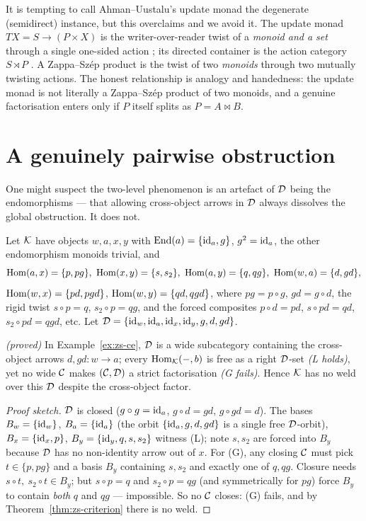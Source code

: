 \begin{remark}\label{rem:zs-au}
It is tempting to call Ahman--Uustalu's update monad \cite{au-update} the
degenerate (semidirect) instance, but this overclaims and we avoid it. The update
monad $TX=S\to(P\times X)$ is the writer-over-reader twist of a \emph{monoid and a
set} through a single one-sided action \cite{au-update}; its directed container is
the action category $S\rtimes P$ \cite{AU16}. A Zappa--Sz\'ep product is the
twist of two \emph{monoids} through two mutually twisting actions. The honest
relationship is analogy and handedness: the update monad is not literally a
Zappa--Sz\'ep product of two monoids, and a genuine factorisation enters only if
$P$ itself splits as $P=A\bowtie B$.
\end{remark}

\section{A genuinely pairwise obstruction}\label{sec:zs-ce}

One might suspect the two-level phenomenon is an artefact of $\mathcal{D}$ being the
endomorphisms --- that allowing cross-object arrows in $\mathcal{D}$ always dissolves the
global obstruction. It does not.

\begin{example}\label{ex:zs-ce}
Let $\mathcal{K}$ have objects $w,a,x,y$ with $\mathrm{End}(a)=\{\mathrm{id}_a,g\}$, $g^2=\mathrm{id}_a$, the other
endomorphism monoids trivial, and
\[
  \Hom(a,x)=\{p,pg\},\ \Hom(x,y)=\{s,s_2\},\ \Hom(a,y)=\{q,qg\},\
  \Hom(w,a)=\{d,gd\},
\]
$\mathrm{Hom}(w,x)=\{pd,pgd\}$, $\mathrm{Hom}(w,y)=\{qd,qgd\}$, where $pg=p\circ g$, $gd=g\circ d$,
the rigid twist $s\circ p=q$, $s_2\circ p=qg$, and the forced composites $p\circ
d=pd$, $s\circ pd=qd$, $s_2\circ pd=qgd$, etc. Let $\mathcal{D}=\{\mathrm{id}_w,\mathrm{id}_a,\mathrm{id}_x,\mathrm{id}_y,
g,d,gd\}$.
\end{example}

\begin{proposition}\label{prop:zs-ce}
\emph{(proved)}\;
In Example~\ref{ex:zs-ce}, $\mathcal{D}$ is a wide subcategory containing the cross-object
arrows $d,gd\colon w\to a$; every $\mathrm{Hom}_{\mathcal{K}}(-,b)$ is free as a right $\mathcal{D}$-set
\emph{(L holds)}, yet no wide $\mathcal{C}$ makes $(\mathcal{C},\mathcal{D})$ a strict factorisation
\emph{(G fails)}. Hence $\mathcal{K}$ has no weld over this $\mathcal{D}$ despite the cross-object
factor.
\end{proposition}

\begin{proof}[Proof sketch]
$\mathcal{D}$ is closed ($g\circ g=\mathrm{id}_a$, $g\circ d=gd$, $g\circ gd=d$). The bases
$B_w=\{\mathrm{id}_w\}$, $B_a=\{\mathrm{id}_a\}$ (the orbit $\{\mathrm{id}_a,g,d,gd\}$ is a single free
$\mathcal{D}$-orbit), $B_x=\{\mathrm{id}_x,p\}$, $B_y=\{\mathrm{id}_y,q,s,s_2\}$ witness (L); note $s,s_2$
are forced into $B_y$ because $\mathcal{D}$ has no non-identity arrow out of $x$. For (G),
any closing $\mathcal{C}$ must pick $t\in\{p,pg\}$ and a basis $B_y$ containing $s,s_2$ and
exactly one of $q,qg$. Closure needs $s\circ t,\ s_2\circ t\in B_y$; but $s\circ
p=q$ and $s_2\circ p=qg$ (and symmetrically for $pg$) force $B_y$ to contain
\emph{both} $q$ and $qg$ --- impossible. So no $\mathcal{C}$ closes: (G) fails, and by
Theorem~\ref{thm:zs-criterion} there is no weld.
\end{proof}

